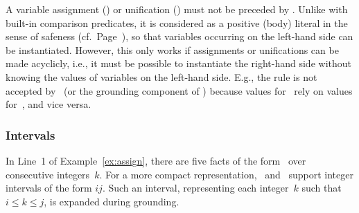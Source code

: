 \begin{Note}
A variable assignment (\code{=}) or unification (\code{:=})
must not be preceded by .
Unlike with built-in comparison predicates,
it is considered as
a positive (body) literal in the sense of safeness (cf.\ Page~\pageref{pg:safe}),
so that variables occurring on the left-hand side can be instantiated.
However, this only works if assignments or unifications
can be made acyclicly, i.e.,
it must be possible to instantiate the right-hand side
without knowing the values of variables on
the left-hand side.
E.g., the rule 
is not accepted by \gringo\ (or the grounding component of \clingo)
because values for~ rely on values for~, and vice versa.
%
%
\end{Note}

\subsubsection{Intervals}\label{subsec:gringo:interval}

In Line~1 of Example~\ref{ex:assign},
there are five facts of the form~
over consecutive integers~$k$.
For a more compact representation,
\gringo\ and \clingo\ support integer intervals of the form $i$$j$.
Such an interval, representing each integer~$k$ such that $i\leq k\leq j$,
is expanded during grounding.

